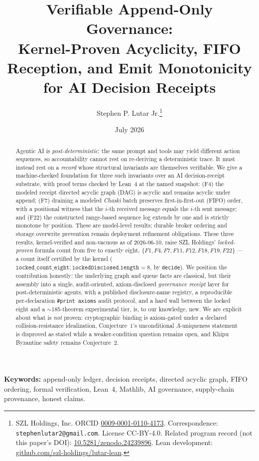 \documentclass[11pt,letterpaper]{article}
\title{\textbf{Verifiable Append-Only Governance:}\\
  Kernel-Proven Acyclicity, FIFO Reception, and Emit Monotonicity\\
  for AI Decision Receipts}
\author{Stephen P. Lutar Jr.\thanks{SZL Holdings, Inc. ORCID
  \href{https://orcid.org/0009-0001-0110-4173}{0009-0001-0110-4173}.
  Correspondence: \texttt{stephenlutar2@gmail.com}. License CC-BY-4.0.
  Related program record (not this paper's DOI):
  \href{https://doi.org/10.5281/zenodo.24239896}{10.5281/zenodo.24239896}.
  Lean development: \href{https://github.com/szl-holdings/lutar-lean}{github.com/szl-holdings/lutar-lean}.}}
\date{July 2026}
\theoremstyle{definition}
\begin{document}
\maketitle

\begin{abstract}
Agentic AI is \emph{post-deterministic}: the same prompt and tools may yield
different action sequences, so accountability cannot rest on re-deriving a
deterministic trace. It must instead rest on a \emph{record} whose structural
invariants are themselves verifiable. We give a machine-checked foundation for
three such invariants over an AI decision-receipt substrate, with proof terms
checked by Lean~4 at the named snapshot: (F4) the modeled receipt directed
acyclic graph (DAG) is acyclic and remains acyclic under append; (F7) draining
a modeled \emph{Chaski} batch preserves first-in-first-out (FIFO) order, with a
positional witness that the $i$-th received message equals the $i$-th sent
message; and (F22) the constructed range-based sequence log extends by one and
is strictly monotone by position. These are model-level results; durable broker
ordering and storage overwrite prevention remain deployment refinement
obligations.
These three results, kernel-verified and non-vacuous as of 2026-06-10, raise
SZL Holdings' \emph{locked-proven} formula count from five to exactly eight,
$\{F1,F4,F7,F11,F12,F18,F19,F22\}$ --- a count itself certified by the kernel
($\texttt{locked\_count\_eight} : \texttt{lockedDisclosed.length} = 8$, by
\texttt{decide}). We position the contribution honestly: the underlying graph
and queue facts are classical, but their assembly into a single,
audit-oriented, axiom-disclosed \emph{governance receipt} layer for
post-deterministic agents, with a published disclosure-name registry, a
reproducible per-declaration \texttt{\#print axioms} audit protocol, and a hard
wall between the locked eight and a $\sim$185-theorem experimental tier, is,
to our knowledge, new. We are explicit
about what is \emph{not} proven: cryptographic binding is axiom-gated under a
declared collision-resistance idealization, Conjecture~1's unconditional
$\Lambda$-uniqueness statement is disproved as stated while a weaker-condition
question remains open, and Khipu Byzantine safety remains Conjecture~2.
\end{abstract}

\noindent\textbf{Keywords:} append-only ledger, decision receipts, directed
acyclic graph, FIFO ordering, formal verification, Lean~4, Mathlib, AI
governance, supply-chain provenance, honest claims.
\end{document}
